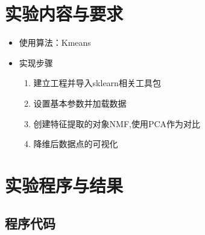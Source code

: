 \documentclass[a4paper]{ctexart}
\begin{document}
  \section{实验内容与要求}
    \begin{itemize}
      \item 使用算法：Kmeans
      \item 实现步骤
      \begin{enumerate}
        \item 建立工程并导入sklearn相关工具包
        \item 设置基本参数并加载数据
        \item 创建特征提取的对象NMF,使用PCA作为对比
        \item 降维后数据点的可视化
      \end{enumerate}
    \end{itemize}

  \section{实验程序与结果}
  \subsection{程序代码}
  
\end{document}
